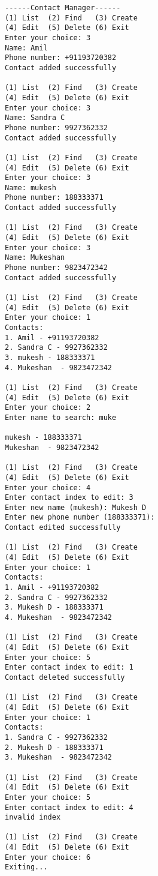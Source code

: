 \documentclass[12pt, a4paper]{article}
\begin{document}
\begin{verbatim}
------Contact Manager------
(1) List  (2) Find   (3) Create
(4) Edit  (5) Delete (6) Exit
Enter your choice: 3
Name: Amil    
Phone number: +91193720382        
Contact added successfully

(1) List  (2) Find   (3) Create
(4) Edit  (5) Delete (6) Exit
Enter your choice: 3
Name: Sandra C
Phone number: 9927362332
Contact added successfully

(1) List  (2) Find   (3) Create
(4) Edit  (5) Delete (6) Exit
Enter your choice: 3
Name: mukesh
Phone number: 188333371
Contact added successfully

(1) List  (2) Find   (3) Create
(4) Edit  (5) Delete (6) Exit
Enter your choice: 3
Name: Mukeshan 
Phone number: 9823472342
Contact added successfully

(1) List  (2) Find   (3) Create
(4) Edit  (5) Delete (6) Exit
Enter your choice: 1
Contacts:
1. Amil - +91193720382
2. Sandra C - 9927362332
3. mukesh - 188333371
4. Mukeshan  - 9823472342

(1) List  (2) Find   (3) Create
(4) Edit  (5) Delete (6) Exit
Enter your choice: 2
Enter name to search: muke

mukesh - 188333371
Mukeshan  - 9823472342

(1) List  (2) Find   (3) Create
(4) Edit  (5) Delete (6) Exit
Enter your choice: 4
Enter contact index to edit: 3
Enter new name (mukesh): Mukesh D
Enter new phone number (188333371): 
Contact edited successfully

(1) List  (2) Find   (3) Create
(4) Edit  (5) Delete (6) Exit
Enter your choice: 1
Contacts:
1. Amil - +91193720382
2. Sandra C - 9927362332
3. Mukesh D - 188333371
4. Mukeshan  - 9823472342

(1) List  (2) Find   (3) Create
(4) Edit  (5) Delete (6) Exit
Enter your choice: 5
Enter contact index to edit: 1
Contact deleted successfully

(1) List  (2) Find   (3) Create
(4) Edit  (5) Delete (6) Exit
Enter your choice: 1
Contacts:
1. Sandra C - 9927362332
2. Mukesh D - 188333371
3. Mukeshan  - 9823472342

(1) List  (2) Find   (3) Create
(4) Edit  (5) Delete (6) Exit
Enter your choice: 5
Enter contact index to edit: 4
invalid index

(1) List  (2) Find   (3) Create
(4) Edit  (5) Delete (6) Exit
Enter your choice: 6
Exiting...
\end{verbatim}
\end{document}
